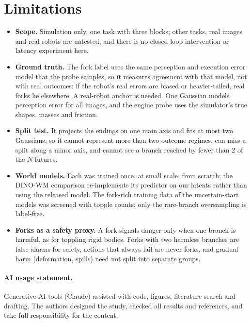 \documentclass{article}
\begin{document}
\section*{Limitations}
\begin{itemize}\setlength{\itemsep}{1pt}\setlength{\parskip}{0pt}
\item \textbf{Scope.} Simulation only, one task with three blocks; other tasks, real images and real
robots are untested, and there is no closed-loop intervention or latency experiment here.
\item \textbf{Ground truth.} The fork label uses the same perception and execution error model that the
probe samples, so it measures agreement with that model, not with real outcomes: if the robot's real errors
are biased or heavier-tailed, real forks lie elsewhere. A real-robot anchor is needed. One Gaussian models perception error for all images, and the engine probe uses the simulator's
true shapes, masses and friction.
\item \textbf{Split test.} It projects the endings on one main axis and fits at most two Gaussians, so it
cannot represent more than two outcome regimes, can miss a split along a minor axis, and cannot see a branch
reached by fewer than 2 of the $N$ futures.
\item \textbf{World models.} Each was trained once, at small scale, from scratch; the DINO-WM comparison
re-implements its predictor on our latents rather than using the released model. The fork-rich training
data of the uncertain-start models was screened with topple counts; only the rare-branch oversampling is
label-free.
\item \textbf{Forks as a safety proxy.} A fork signals danger only when one branch is harmful, as for
toppling rigid bodies. Forks with two harmless branches are false alarms for safety, actions that always
fail are never forks, and gradual harm (deformation, spills) need not split into separate groups.
\end{itemize}

\paragraph{AI usage statement.} Generative AI tools (Claude) assisted with code, figures, literature
search and drafting. The authors designed the study, checked all results and references, and take full
responsibility for the content.



\appendix
\end{document}
